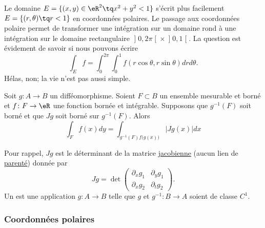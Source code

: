 Le domaine $E=\{ (x,y)\in\eR^2\tq x^2+y^2<1 \}$ s'écrit plus facilement $E=\{ (r,\theta)\tq r<1 \}$ en coordonnées polaires. Le passage aux coordonnées polaire permet de transformer une intégration sur un domaine rond à une intégration sur le domaine rectangulaire $\mathopen]0,2\pi\mathclose[\times\mathopen]0,1\mathclose[$. La question est évidement de savoir si nous pouvons écrire
\begin{equation}
	\int_Ef=\int_{0}^{2\pi}\int_0^1f(r\cos\theta,r\sin\theta)drd\theta.
\end{equation}
Hélas, non; la vie n'est pas aussi simple.

\begin{theorem}
Soit $g\colon A\to B$ un difféomorphisme. Soient $F\subset B$ un ensemble mesurable et borné et $f\colon F\to \eR$ une fonction bornée et intégrable. Supposons que $g^{-1}(F)$ soit borné et que $Jg$ soit borné sur $g^{-1}(F)$. Alors
\begin{equation}
	\int_Ff(x)dy=\int_{g^{-1}(F)f\big( g(x) \big)}| Jg(x) |dx
\end{equation}
\end{theorem}
Pour rappel, $Jg$ est le déterminant de la matrice \href{http://fr.wikipedia.org/wiki/Matrice_jacobienne}{jacobienne} (aucun lien de \href{http://fr.wikipedia.org/wiki/Jacob}{parenté}) donnée par
\begin{equation}
	Jg=\det\begin{pmatrix}
	\partial_xg_1	&	\partial_yg_1	\\ 
	\partial_xg_2	&	\partial_tg_2	
\end{pmatrix}.
\end{equation}
Un  est une application $g\colon A\to B$ telle que $g$ et $g^{-1}\colon B\to A$ soient de classe $C^1$.

					\subsubsection{Coordonnées polaires}

